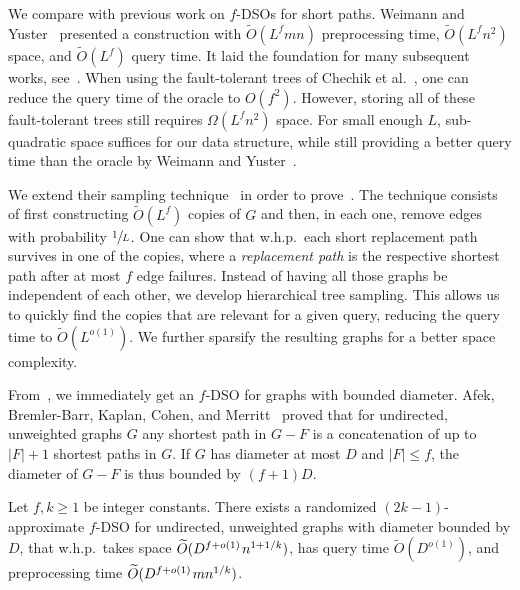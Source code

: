 \documentclass{theoretics}
\newcommand*{\Otilde}{\widetilde{O}}
\newcommand*{\nwspace}{\hspace*{.1em}}
\renewcommand{\le}{\leqslant}
\renewcommand{\ge}{\geqslant}
\begin{document}
We compare  with previous work on $f$-DSOs for short paths.
Weimann and Yuster~\cite{WY13} presented a construction with $\Otilde(L^f mn)$ preprocessing time, 
$\Otilde(L^f n^2)$ space, and $\Otilde(L^f)$ query time. 
It laid the foundation for many subsequent works, see~\cite{AlonChechikCohen19CombinatorialRP,BCFS21DiameterOracle_MFCS,Bilo22Extremal,
KarthikParter21DeterministicRPC,Ren22Improved}.
When using the fault-tolerant trees of Chechik et al.~\cite{ChCoFiKa17}, 
one can reduce the query time of the oracle to $O(f^2)$.
However, storing all of these fault-tolerant trees still requires $\Omega(L^f n^2)$ space.
For small enough $L$, sub-quadratic space suffices for our data structure,
while still providing a better query time than the oracle by Weimann and Yuster~\cite{WY13}. 

We extend their sampling technique~\cite{WY13}
in order to prove~.
The technique consists of first constructing $\Otilde(L^f)$ copies of $G$ and then, in each one,
remove edges with probability $\sfrac{1}{L}$.
One can show that w.h.p.\ each short replacement path survives in one of the copies,
where a \emph{replacement path} is the respective shortest path after at most $f$ edge failures.
Instead of having all those graphs be independent of each other, 
we develop hierarchical tree sampling.
This allows us to quickly find
the copies that are relevant for a given query, 
reducing the query time to $\Otilde(L^{o(1)})$.
We further sparsify the resulting graphs for a better space complexity.

From~, we immediately get an $f$-DSO for graphs with bounded diameter. Afek, Bremler-Barr, Kaplan, Cohen, and Merritt~\cite{Afek02RestorationbyPathConcatenation_journal}
proved that for undirected, unweighted graphs $G$ any shortest path in $G-F$
is a concatenation of up to $|F|+1$ shortest paths in $G$.
If $G$ has diameter at most $D$ and $|F| \le f$, the diameter of $G-F$ is thus bounded by $(f{+}1)D$.

\begin{corollary}
\label{cor:oracle_bounded_diameter}
  Let $f,k \ge 1$ be integer constants.
  There exists a randomized $(2k{-}1)$-approximate $f$-DSO for undirected, unweighted graphs
  with diameter bounded by $D$,
  that w.h.p.\ takes space $\Otilde(D^{f+o(1)} \nwspace n^{1+1/k})$, 
  has query time $\Otilde(D^{o(1)})$, and preprocessing time $\Otilde(D^{f+o(1)} \nwspace mn^{1/k})$.
\end{corollary}
\end{document}
